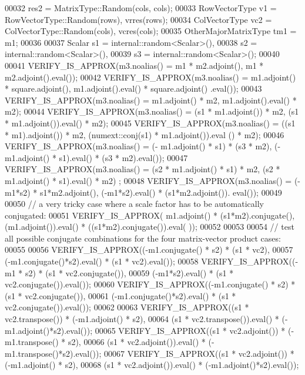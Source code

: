 \begin{DoxyCode}
00032              res2 = MatrixType::Random(cols, cols);
00033   RowVectorType v1 = RowVectorType::Random(rows), vrres(rows);
00034   ColVectorType vc2 = ColVectorType::Random(cols), vcres(cols);
00035   OtherMajorMatrixType tm1 = m1;
00036 
00037   Scalar s1 = internal::random<Scalar>(),
00038          s2 = internal::random<Scalar>(),
00039          s3 = internal::random<Scalar>();
00040 
00041   VERIFY\_IS\_APPROX(m3.noalias() = m1 * m2.adjoint(),                 m1 * m2.adjoint().eval());
00042   VERIFY\_IS\_APPROX(m3.noalias() = m1.adjoint() * square.adjoint(),   m1.adjoint().eval() * square.adjoint()
      .eval());
00043   VERIFY\_IS\_APPROX(m3.noalias() = m1.adjoint() * m2,                 m1.adjoint().eval() * m2);
00044   VERIFY\_IS\_APPROX(m3.noalias() = (s1 * m1.adjoint()) * m2,          (s1 * m1.adjoint()).eval() * m2);
00045   VERIFY\_IS\_APPROX(m3.noalias() = ((s1 * m1).adjoint()) * m2,        (numext::conj(s1) * m1.adjoint()).eval
      () * m2);
00046   VERIFY\_IS\_APPROX(m3.noalias() = (- m1.adjoint() * s1) * (s3 * m2), (- m1.adjoint()  * s1).eval() * (s3 * 
      m2).eval());
00047   VERIFY\_IS\_APPROX(m3.noalias() = (s2 * m1.adjoint() * s1) * m2,     (s2 * m1.adjoint()  * s1).eval() * m2)
      ;
00048   VERIFY\_IS\_APPROX(m3.noalias() = (-m1*s2) * s1*m2.adjoint(),        (-m1*s2).eval() * (s1*m2.adjoint()).
      eval());
00049 
00050   \textcolor{comment}{// a very tricky case where a scale factor has to be automatically conjugated:}
00051   VERIFY\_IS\_APPROX( m1.adjoint() * (s1*m2).conjugate(), (m1.adjoint()).eval() * ((s1*m2).conjugate()).eval(
      ));
00052 
00053 
00054   \textcolor{comment}{// test all possible conjugate combinations for the four matrix-vector product cases:}
00055 
00056   VERIFY\_IS\_APPROX((-m1.conjugate() * s2) * (s1 * vc2),
00057                    (-m1.conjugate()*s2).eval() * (s1 * vc2).eval());
00058   VERIFY\_IS\_APPROX((-m1 * s2) * (s1 * vc2.conjugate()),
00059                    (-m1*s2).eval() * (s1 * vc2.conjugate()).eval());
00060   VERIFY\_IS\_APPROX((-m1.conjugate() * s2) * (s1 * vc2.conjugate()),
00061                    (-m1.conjugate()*s2).eval() * (s1 * vc2.conjugate()).eval());
00062 
00063   VERIFY\_IS\_APPROX((s1 * vc2.transpose()) * (-m1.adjoint() * s2),
00064                    (s1 * vc2.transpose()).eval() * (-m1.adjoint()*s2).eval());
00065   VERIFY\_IS\_APPROX((s1 * vc2.adjoint()) * (-m1.transpose() * s2),
00066                    (s1 * vc2.adjoint()).eval() * (-m1.transpose()*s2).eval());
00067   VERIFY\_IS\_APPROX((s1 * vc2.adjoint()) * (-m1.adjoint() * s2),
00068                    (s1 * vc2.adjoint()).eval() * (-m1.adjoint()*s2).eval());

\end{DoxyCode}
